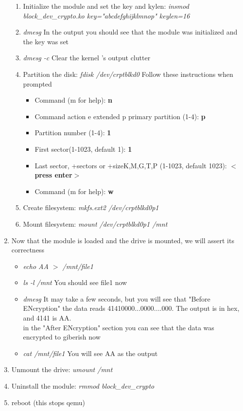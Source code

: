 \documentclass[draftclsnofoot, onecolumn, 10pt, compsoc]{IEEEtran}
\begin{document}
\begin{enumerate}
\begin{enumerate}
					\item Initialize the module and set the key and kylen: \textit{insmod block\_dev\_crypto.ko key="abcdefghijklmnop" keylen=16}
					\item \textit{dmesg} In the output you should see that the module was initialized and the key was set
					\item \textit{dmesg -c} Clear the kernel 's output clutter
					\item Partition the disk:\textit{ fdisk /dev/crptblkd0}
						Follow these instructions when prompted
						\begin{itemize}
							\item Command (m for help): \textbf{n}
							\item Command action
   e extended
   p primary partition (1-4):
\textbf{p}
							\item Partition number (1-4): \textbf{1}
							\item First sector(1-1023, default 1): \textbf{1}
							\item Last sector, +sectors or +size{K,M,G,T,P} (1-1023, default 1023): \textbf{$<$press enter$>$}
							\item Command (m for help): \textbf{w}
						\end{itemize}
					\item Create filesystem: \textit{mkfs.ext2 /dev/crptblkd0p1}
					\item Mount filesystem: \textit{mount /dev/crptblkd0p1 /mnt}
				\end{enumerate}
				\item Now that the module is loaded and the drive is mounted, we will assert its correctness
				\begin{itemize}
					\item \textit{echo AA  $>$ /mnt/file1}
					\item \textit{ls -l /mnt} You should see file1 now
					\item \textit{dmesg} It may take a few seconds, but you will see that "Before ENcryption" the data reads 41410000...0000....000. The output is in hex, and 4141 is AA. \\
					in the "After ENcryption" section you can see that the data was encrypted to giberish now
					\item \textit{cat /mnt/file1} You will see AA as the output
				\end{itemize}
				\item Unmount the drive: \textit{umount /mnt}
				\item Uninstall the module: \textit{rmmod block\_dev\_crypto}
				\item reboot (this stops qemu)
			\end{enumerate}
\end{document}
